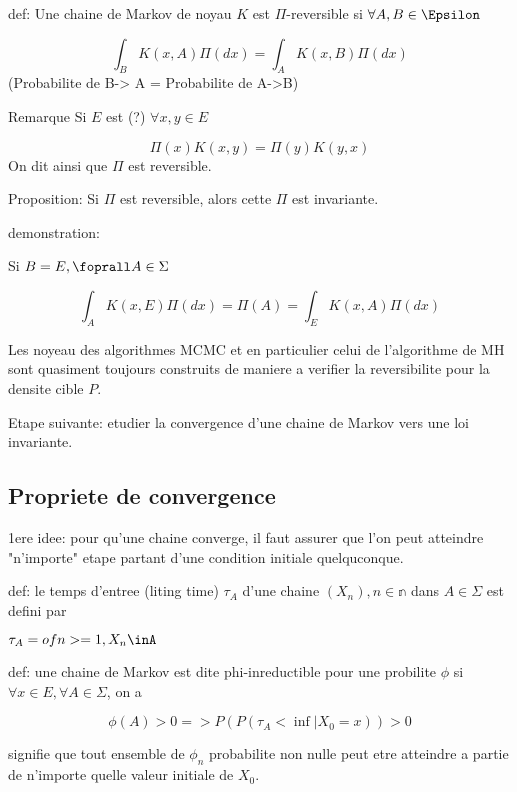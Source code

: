 \documentclass{article}
\begin{document}
def: Une chaine de Markov de noyau $K$ est $\Pi$-reversible si $\forall A,B \in \Epsilon$

\begin{equation}
\int_B K(x,A)\Pi(dx) = \int_A K(x,B)\Pi(dx)
\end{equation}
(Probabilite de B-> A = Probabilite de A->B)

Remarque Si $E$ est (?)
$\forall x,y \in E$

\begin{equation}
\Pi(x)K(x,y)=\Pi(y)K(y,x)
\end{equation}
On dit ainsi que $\Pi$ est reversible.

Proposition: Si $\Pi$ est reversible, alors cette $\Pi$ est invariante.

demonstration:

Si $B=E, \foprall A \in \Sigma$

\begin{equation}
\int_A K(x,E)\Pi(dx)=\Pi(A)=\int_E K(x,A)\Pi(dx)
\end{equation}

Les noyeau des algorithmes MCMC et en particulier celui de l'algorithme de MH sont quasiment toujours construits de maniere a verifier la reversibilite pour la densite cible $P$.

Etape suivante: etudier la convergence d'une chaine de Markov vers une loi invariante.

\subsection{Propriete de convergence}

1ere idee: pour qu'une chaine converge, il faut assurer que l'on peut atteindre "n'importe" etape partant d'une condition initiale quelquconque.

def: le temps d'entree (liting time) $\tau_A$ d'une chaine $(X_n),n\in \mathbb{n}$ dans $A\in \Sigma$ est defini par

$\tau_A= of n>=1, X_n\inA$

def: une chaine de Markov est dite phi-inreductible pour une probilite $\phi$ si $\forall x \in E, \forall A\in \Sigma$, on a

\begin{equation}
\phi(A)>0 => P(P(\tau_A<\inf|X_0=x)) >0
\end{equation}

signifie que tout ensemble de $\phi_n$ probabilite non nulle peut etre atteindre a partie de n'importe quelle valeur initiale de $X_0$.     
\end{document}
